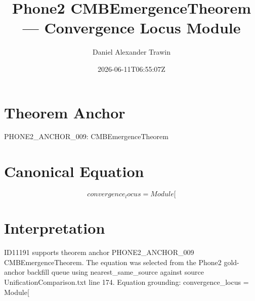 \documentclass[11pt]{article}
\title{Phone2 CMBEmergenceTheorem — Convergence Locus Module}
\author{Daniel Alexander Trawin}
\date{2026-06-11T06:55:07Z}
\begin{document}
\maketitle
\section*{Theorem Anchor}
PHONE2_ANCHOR_009: CMBEmergenceTheorem
\section*{Canonical Equation}
\[
convergence_locus = Module[
\]
\section*{Interpretation}
ID11191 supports theorem anchor PHONE2_ANCHOR_009 CMBEmergenceTheorem. The equation was selected from the Phone2 gold-anchor backfill queue using nearest_same_source against source UnificationComparison.txt line 174. Equation grounding: convergence_locus = Module[
\end{document}
